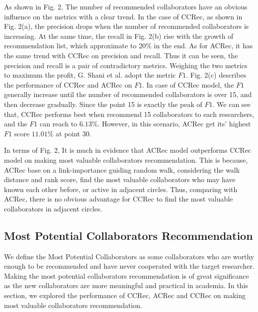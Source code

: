 \documentclass{acm_proc_article-sp}
\begin{document}
As shown in Fig. 2, The number of recommended collaborators have an obvious influence on the metrics with a clear trend. In the case of CCRec, as shown in Fig. 2(a), the precision drops when the number of recommended collaborators is increasing. At the same time, the recall in Fig. 2(b) rise with the growth of recommendation list, which approximate to $20\%$ in the end. As for ACRec, it has the same trend with CCRec on precision and recall. Thus it can be seen, the precision and recall is a pair of contradictory metrics. Weighing the two metrics to maximum the profit, G. Shani et al. \cite{shani2011evaluating} adopt the metric $F1$. Fig. 2(c) describes the performance of CCRec and ACRec on $F1$. In case of CCRec model, the $F1$ generally increase until the number of recommended collaborators is over 15, and then decrease gradually. Since the point 15 is exactly the peak of $F1$. We can see that, CCRec performs best when recommend 15 collaborators to each researchers, and the $F1$ can reach to $6.13\%$. However, in this scenario, ACRec get its' highest $F1$ score $11.01\%$ at point 30.

In terms of Fig. 2, It is  much in evidence that ACRec model outperforms CCRec model on making most valuable collaborators recommendation. This is because, ACRec base on a link-importance guiding random walk, considering the walk distance and rank score, find the most valuable collaborators who may have known each other before, or active in adjacent circles. Thus, comparing with ACRec, there is no obvious advantage for CCRec to find the most valuable collaborators in adjacent circles.

\subsection{Most Potential Collaborators Recommendation}
We define the Most Potential Collaborators as some collaborators who are worthy enough to be recommended and have never cooperated with the target researcher. Making the most potential collaborators recommendation is of great significance as the new collaborators are more meaningful and practical in academia. In this section, we explored the performance of CCRec, ACRec and CCRec on making most valuable collaborators recommendation.
\end{document}
